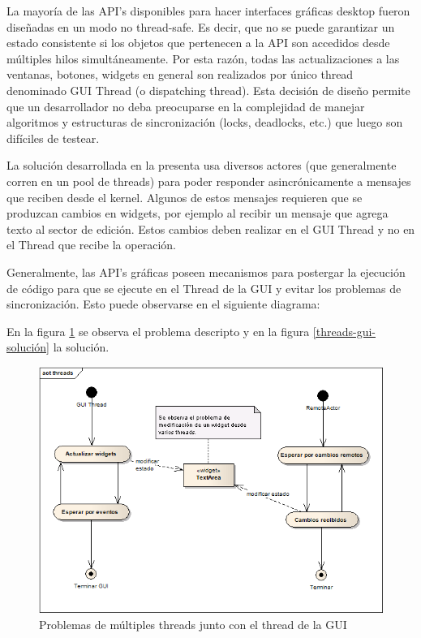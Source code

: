 \documentclass[12pt,a4paper]{article}
\begin{document}
La mayoría de las API’s disponibles para hacer interfaces gráficas desktop fueron diseñadas en un 
modo no thread-safe. Es decir, que no se puede garantizar un estado consistente si los objetos que pertenecen a la API son
accedidos desde múltiples hilos simultáneamente. Por esta razón, todas las actualizaciones a las ventanas, botones, widgets
en general son realizados por único thread denominado GUI Thread (o dispatching thread). Esta decisión de diseño permite que
un desarrollador no deba preocuparse en la complejidad de manejar algoritmos y estructuras de sincronización
(locks, deadlocks, etc.) que luego son difíciles de testear.

La solución desarrollada en la presenta usa diversos actores (que generalmente corren en un pool de threads) para poder 
responder asincrónicamente a mensajes que reciben desde el kernel. Algunos de estos mensajes requieren que se produzcan
cambios en widgets, por ejemplo al recibir un mensaje que agrega texto al sector de edición. Estos cambios deben realizar en
el GUI Thread y no en el Thread que recibe la operación.

Generalmente, las API’s gráficas poseen mecanismos para postergar la ejecución de código para que se ejecute en el Thread de
la GUI y evitar los problemas de sincronización. Esto puede observarse en el siguiente diagrama:

En la figura \ref{threads-gui} se observa el problema descripto y en la figura \ref{threads-gui-solución} la solución.

	\begin{figure}[!ht]
		\begin{center}
			\includegraphics[width=14cm]{threads-gui.png}
			\caption{\label{threads-gui} Problemas de múltiples threads junto con el thread de la GUI }
		\end{center}
	\end{figure}
\end{document}
